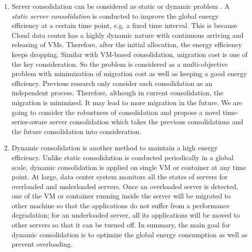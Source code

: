 \begin{enumerate}
\item Server consolidation can be considered as static or dynamic problem \cite{Xiao:2015ik}.
A \emph{static server consolidation} is conducted to improve the global energy efficiency at a certain time point, e.g. a fixed time interval. This is because Cloud data center has a highly dynamic nature with continuous arriving and releasing of VMs. Therefore, 
after the initial allocation, the energy efficiency keeps dropping. Similar with VM-based consolidation, migration cost is one of the key consideration. So the problem is considered as a multi-objective problem with minimization of migration cost as well as keeping a good energy efficiency. Previous research only consider each consolidation as an independent process. Therefore, although in current consolidation, the migration is minimized. It may lead to more migration in the future. We are going to consider the robustness of consolidation and propose a novel time-series-aware server consolidation which takes the previous consolidations and the future consolidation into consideration. 
\item Dynamic consolidation is another method to maintain a high energy efficiency. Unlike static consolidation is conducted periodically in a global scale, dynamic consolidation is applied on single VM or container at any time point.  At large, data center system monitors all the states of servers for overloaded and underloaded servers. Once an overloaded server is detected, one of the VM or container running inside the server will be migrated to other machine so that the applications do not suffer from a performance degradation; for an underloaded server, all its applications will be moved to other servers so that it can be turned off. In summary, the main goal for dynamic consolidation is to optimize the global energy consumption as well as prevent overloading.

\end{enumerate}
